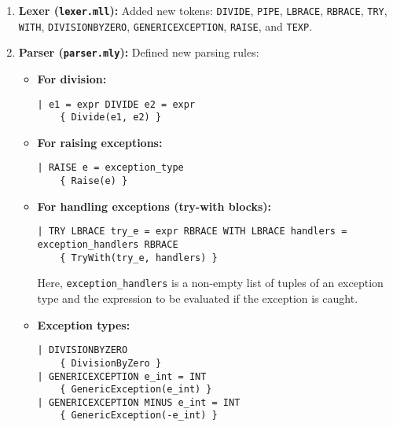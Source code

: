 \documentclass[a4paper,12pt]{article}
\begin{document}
\begin{enumerate}[left=0.5cm]
    \item \textbf{Lexer (\texttt{lexer.mll}):}  
    Added new tokens: \texttt{DIVIDE}, \texttt{PIPE}, \texttt{LBRACE}, \texttt{RBRACE}, \texttt{TRY}, \texttt{WITH}, \texttt{DIVISIONBYZERO}, \texttt{GENERICEXCEPTION}, \texttt{RAISE}, and \texttt{TEXP}.
    
    \item \textbf{Parser (\texttt{parser.mly}):} Defined new parsing rules:
    \begin{itemize}[left=0.2cm]
        \item \textbf{For division:}
\begin{lstlisting}
| e1 = expr DIVIDE e2 = expr
    { Divide(e1, e2) }
\end{lstlisting}

        \item \textbf{For raising exceptions:}
\begin{lstlisting}
| RAISE e = exception_type
    { Raise(e) }
\end{lstlisting}

        \item \textbf{For handling exceptions (try-with blocks):}
\begin{lstlisting}
| TRY LBRACE try_e = expr RBRACE WITH LBRACE handlers = exception_handlers RBRACE
    { TryWith(try_e, handlers) }
\end{lstlisting}
        Here, \texttt{exception\_handlers} is a non-empty list of tuples of an exception type and the expression to be evaluated if the exception is caught.

        \item \textbf{Exception types:}
\begin{lstlisting}
| DIVISIONBYZERO
    { DivisionByZero }
| GENERICEXCEPTION e_int = INT
    { GenericException(e_int) }
| GENERICEXCEPTION MINUS e_int = INT
    { GenericException(-e_int) }
\end{lstlisting}
    \end{itemize}


\end{enumerate}
\end{document}
